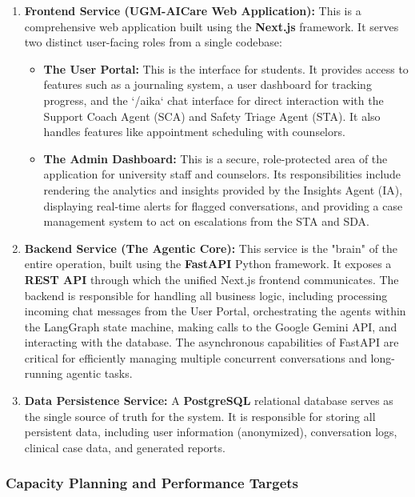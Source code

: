 \begin{enumerate}
    \item \textbf{Frontend Service (UGM-AICare Web Application):} This is a comprehensive web application built using the \textbf{Next.js} framework. It serves two distinct user-facing roles from a single codebase:
        \begin{itemize}
            \item \textbf{The User Portal:} This is the interface for students. It provides access to features such as a journaling system, a user dashboard for tracking progress, and the `/aika` chat interface for direct interaction with the Support Coach Agent (SCA) and Safety Triage Agent (STA). It also handles features like appointment scheduling with counselors.
            \item \textbf{The Admin Dashboard:} This is a secure, role-protected area of the application for university staff and counselors. Its responsibilities include rendering the analytics and insights provided by the Insights Agent (IA), displaying real-time alerts for flagged conversations, and providing a case management system to act on escalations from the STA and SDA.
        \end{itemize}
    \item \textbf{Backend Service (The Agentic Core):} This service is the "brain" of the entire operation, built using the \textbf{FastAPI} Python framework. It exposes a \textbf{REST API} through which the unified Next.js frontend communicates. The backend is responsible for handling all business logic, including processing incoming chat messages from the User Portal, orchestrating the agents within the LangGraph state machine, making calls to the Google Gemini API, and interacting with the database. The asynchronous capabilities of FastAPI are critical for efficiently managing multiple concurrent conversations and long-running agentic tasks.
    \item \textbf{Data Persistence Service:} A \textbf{PostgreSQL} relational database serves as the single source of truth for the system. It is responsible for storing all persistent data, including user information (anonymized), conversation logs, clinical case data, and generated reports.
\end{enumerate}

\subsubsection{Capacity Planning and Performance Targets}

